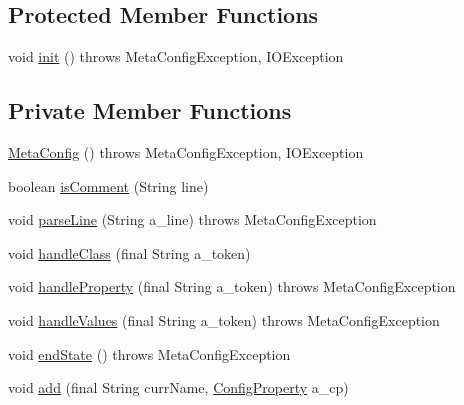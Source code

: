 \subsection*{Protected Member Functions}
\begin{DoxyCompactItemize}
\item 
void \hyperlink{classorg_1_1jgap_1_1data_1_1config_1_1_meta_config_a57946f7a434122e62edcd635cc8c90ca}{init} ()  throws Meta\-Config\-Exception, I\-O\-Exception 
\end{DoxyCompactItemize}
\subsection*{Private Member Functions}
\begin{DoxyCompactItemize}
\item 
\hyperlink{classorg_1_1jgap_1_1data_1_1config_1_1_meta_config_ae0f2f72e6386baecd239c73677f6c678}{Meta\-Config} ()  throws Meta\-Config\-Exception, I\-O\-Exception 
\item 
boolean \hyperlink{classorg_1_1jgap_1_1data_1_1config_1_1_meta_config_a0b52e26076362d5eec69f3c8a17cead4}{is\-Comment} (String line)
\item 
void \hyperlink{classorg_1_1jgap_1_1data_1_1config_1_1_meta_config_a40ab2cfd3becb39d8d9407f9778999e9}{parse\-Line} (String a\-\_\-line)  throws Meta\-Config\-Exception 
\item 
void \hyperlink{classorg_1_1jgap_1_1data_1_1config_1_1_meta_config_aacb9ad84776e83aa3e62861c4a023955}{handle\-Class} (final String a\-\_\-token)
\item 
void \hyperlink{classorg_1_1jgap_1_1data_1_1config_1_1_meta_config_a4aba9c1c20f59f631949e25471bf9ccb}{handle\-Property} (final String a\-\_\-token)  throws Meta\-Config\-Exception 
\item 
void \hyperlink{classorg_1_1jgap_1_1data_1_1config_1_1_meta_config_a3ef6ca619c5527ba46943f8d14fa17ac}{handle\-Values} (final String a\-\_\-token)  throws Meta\-Config\-Exception 
\item 
void \hyperlink{classorg_1_1jgap_1_1data_1_1config_1_1_meta_config_a018a43fa2962acc9144d18829be8b847}{end\-State} ()  throws Meta\-Config\-Exception 
\item 
void \hyperlink{classorg_1_1jgap_1_1data_1_1config_1_1_meta_config_a38387b3d63964e60e3e4af568fa812e6}{add} (final String curr\-Name, \hyperlink{classorg_1_1jgap_1_1data_1_1config_1_1_config_property}{Config\-Property} a\-\_\-cp)
\end{DoxyCompactItemize}
